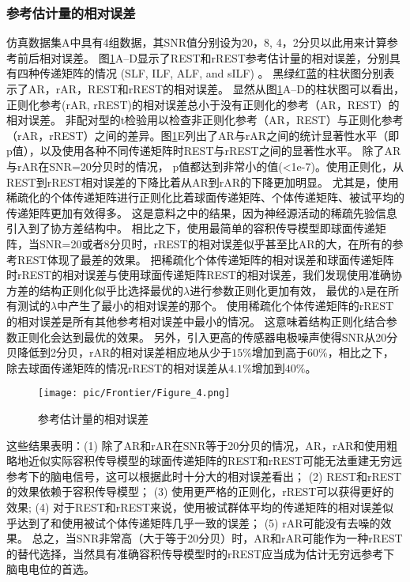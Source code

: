 \subsubsection{参考估计量的相对误差}
仿真数据集A中具有4组数据，其SNR值分别设为20，8, 4，2分贝以此用来计算参考前后相对误差。 图\ref{3.4}A–D显示了REST和rREST参考估计量的相对误差，分别具有四种传递矩阵的情况 (SLF, ILF, ALF, and sILF) 。 黑绿红蓝的柱状图分别表示了AR，rAR，REST和rREST的相对误差。 显然从图\ref{3.4}A–D的柱状图可以看出，正则化参考(rAR, rREST)的相对误差总小于没有正则化的参考（AR，REST）的相对误差。 非配对型的t检验用以检查非正则化参考（AR，REST）与正则化参考（rAR，rREST）之间的差异。图\ref{3.4}E列出了AR与rAR之间的统计显著性水平（即p值），以及使用各种不同传递矩阵时REST与rREST之间的显著性水平。 除了AR与rAR在SNR=20分贝时的情况， p值都达到非常小的值(<1e-7)。使用正则化，从REST到rREST相对误差的下降比着从AR到rAR的下降更加明显。 尤其是，使用稀疏化的个体传递矩阵进行正则化比着球面传递矩阵、个体传递矩阵、被试平均的传递矩阵更加有效得多。 这是意料之中的结果，因为神经源活动的稀疏先验信息引入到了协方差结构中。 相比之下，使用最简单的容积传导模型即球面传递矩阵，当SNR=20或者8分贝时，rREST的相对误差似乎甚至比AR的大，在所有的参考REST体现了最差的效果。 把稀疏化个体传递矩阵的相对误差和球面传递矩阵时rREST的相对误差与使用球面传递矩阵REST的相对误差，我们发现使用准确协方差的结构正则化似乎比选择最优的$\lambda$进行参数正则化更加有效， 最优的$\lambda$是在所有测试的$\lambda$中产生了最小的相对误差的那个。 使用稀疏化个体传递矩阵的rREST的相对误差是所有其他参考相对误差中最小的情况。 这意味着结构正则化结合参数正则化会达到最优的效果。 另外，引入更高的传感器电极噪声使得SNR从20分贝降低到2分贝，rAR的相对误差相应地从少于$15\%$增加到高于$60\%$，相比之下，除去球面传递矩阵的情况rREST的相对误差从$4.1\%$增加到$40\%$。
\begin{figure}[!ht]
	\centering
	\texttt{[image: pic/Frontier/Figure\_4.png]}
	\caption{参考估计量的相对误差}
	\label{3.4}
\end{figure}
这些结果表明：(1) 除了AR和rAR在SNR等于20分贝的情况，AR，rAR和使用粗略地近似实际容积传导模型的球面传递矩阵的REST和rREST可能无法重建无穷远参考下的脑电信号，这可以根据此时十分大的相对误差看出； (2) REST和rREST的效果依赖于容积传导模型； (3) 使用更严格的正则化，rREST可以获得更好的效果; (4) 对于REST和rREST来说，使用被试群体平均的传递矩阵的相对误差似乎达到了和使用被试个体传递矩阵几乎一致的误差； (5) rAR可能没有去噪的效果。 总之，当SNR非常高（大于等于20分贝）时，AR和rAR可能作为一种rREST的替代选择，当然具有准确容积传导模型时的rREST应当成为估计无穷远参考下脑电电位的首选。

